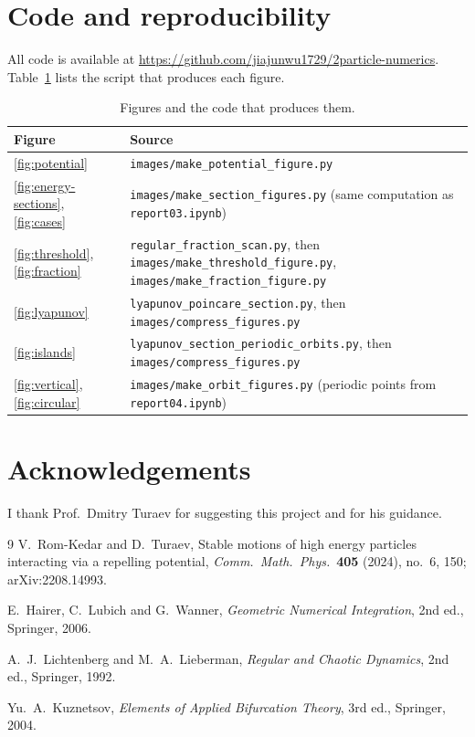 \documentclass[11pt,a4paper]{article}
\begin{document}
\section*{Code and reproducibility}
All code is available at
\url{https://github.com/jiajunwu1729/2particle-numerics}. Table~\ref{tab:repro} lists the
script that produces each figure.

\begin{table}[H]
\centering
\caption{Figures and the code that produces them.}
\label{tab:repro}
\begin{tabular}{@{}ll@{}}
\toprule
Figure & Source\\
\midrule
\ref{fig:potential} & \texttt{images/make\_potential\_figure.py}\\
\ref{fig:energy-sections}, \ref{fig:cases} & \texttt{images/make\_section\_figures.py} (same computation as \texttt{report03.ipynb})\\
\ref{fig:threshold}, \ref{fig:fraction} & \texttt{regular\_fraction\_scan.py}, then \texttt{images/make\_threshold\_figure.py}, \texttt{images/make\_fraction\_figure.py}\\
\ref{fig:lyapunov} & \texttt{lyapunov\_poincare\_section.py}, then \texttt{images/compress\_figures.py}\\
\ref{fig:islands} & \texttt{lyapunov\_section\_periodic\_orbits.py}, then \texttt{images/compress\_figures.py}\\
\ref{fig:vertical}, \ref{fig:circular} & \texttt{images/make\_orbit\_figures.py} (periodic points from \texttt{report04.ipynb})\\
\bottomrule
\end{tabular}
\end{table}

\section*{Acknowledgements}
I thank Prof.\ Dmitry Turaev for suggesting this project and for his guidance.

\begin{thebibliography}{9}
V.~Rom-Kedar and D.~Turaev,
Stable motions of high energy particles interacting via a repelling potential,
\emph{Comm.\ Math.\ Phys.}\ \textbf{405} (2024), no.~6, 150;
arXiv:2208.14993.

E.~Hairer, C.~Lubich and G.~Wanner,
\emph{Geometric Numerical Integration}, 2nd ed., Springer, 2006.

A.~J.~Lichtenberg and M.~A.~Lieberman,
\emph{Regular and Chaotic Dynamics}, 2nd ed., Springer, 1992.

Yu.~A.~Kuznetsov, \emph{Elements of Applied Bifurcation Theory}, 3rd ed.,
Springer, 2004.
\end{thebibliography}
\end{document}
